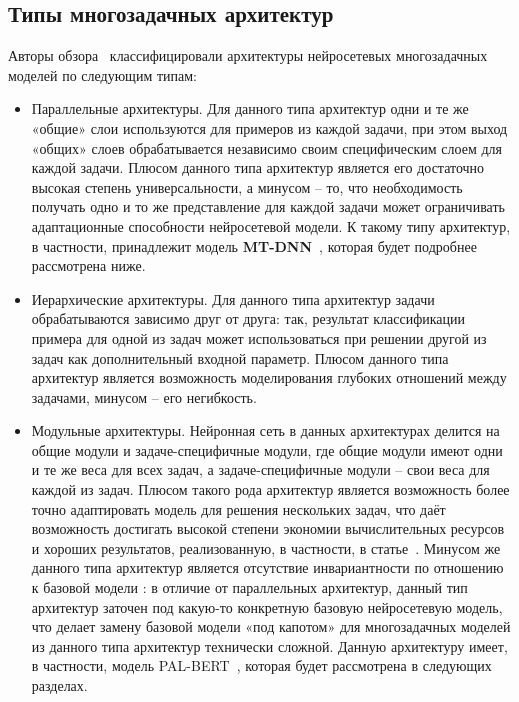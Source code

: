\subsection{Типы многозадачных архитектур}
Авторы обзора~\cite{chen_2021} классифицировали архитектуры нейросетевых многозадачных моделей по следующим типам:
\begin{itemize}
\item Параллельные архитектуры. Для данного типа архитектур одни и те же «общие» слои используются для примеров из каждой задачи, при этом выход «общих» слоев обрабатывается независимо своим специфическим слоем для каждой задачи. Плюсом данного типа архитектур является его достаточно высокая степень универсальности, а минусом -- то, что необходимость получать одно и то же представление для каждой задачи может ограничивать адаптационные способности нейросетевой модели. К такому типу архитектур, в частности, принадлежит модель \textbf{MT-DNN}~\cite{mtdnn}, которая будет подробнее рассмотрена ниже. 
\item Иерархические архитектуры. Для данного типа архитектур задачи обрабатываются зависимо друг от друга: так, результат классификации примера для одной из задач может использоваться при решении другой из задач как дополнительный входной параметр. Плюсом данного типа архитектур является возможность моделирования глубоких отношений между задачами, минусом -- его негибкость. 
\item Модульные архитектуры. Нейронная сеть в данных архитектурах делится на общие модули и задаче-специфичные модули, где общие модули имеют одни и те же веса для всех задач, а задаче-специфичные модули -- свои веса для каждой из задач. Плюсом такого рода архитектур является возможность более точно адаптировать модель для решения нескольких задач, что даёт возможность достигать высокой степени экономии вычислительных ресурсов и хороших результатов, реализованную, в частности, в статье~\cite{maziarka_2021}. Минусом же данного типа архитектур является отсутствие инвариантности по отношению к базовой модели : в отличие от параллельных архитектур, данный тип архитектур заточен под какую-то конкретную базовую нейросетевую модель, что делает замену базовой модели «под капотом» для многозадачных моделей из данного типа архитектур технически сложной. Данную архитектуру имеет, в частности, модель PAL-BERT~\cite{stickland_2019}, которая будет рассмотрена в следующих разделах. 

\end{itemize}
